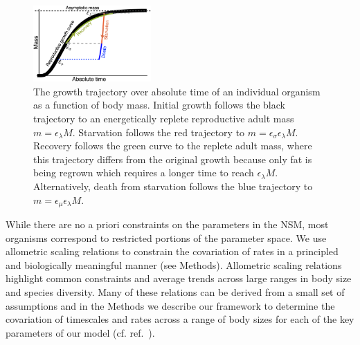 \documentclass[twocolumn,preprintnumbers,amsmath,amssymb,superscriptaddress]{revtex4}
\begin{document}
\begin{bibunit}[unsrt]
\begin{figure}
\centering
\includegraphics[width=0.4\textwidth]{Growth-trajectory-diagram.eps}
\caption{\small{ The growth trajectory over absolute time of an individual organism as a function of body mass.  
Initial growth follows the black trajectory to an energetically replete reproductive adult mass $m=\epsilon_\lambda M$. %
Starvation follows the red trajectory to $m = \epsilon_\sigma \epsilon_\lambda  M$. 
Recovery follows the green curve to the replete adult mass, where this trajectory differs from the original growth because only fat is being regrown which requires a longer time to reach $\epsilon_\lambda M$. %
Alternatively, death from starvation follows the blue trajectory to $m=\epsilon_\mu \epsilon_\lambda  M$.}\label{fig:growth}}
\end{figure}

While there are no a priori constraints on the parameters in the NSM, most
organisms correspond to restricted portions of the parameter space.  We
use allometric scaling relations to constrain the covariation of rates in a
principled and biologically meaningful manner (see Methods).  Allometric scaling relations
highlight common constraints and average trends across large ranges in body
size and species diversity. Many of these relations can be derived from a
small set of assumptions and in the Methods we describe our framework to determine the
covariation of timescales and rates across a range of body sizes for each of
the key parameters of our model (cf. ref.~\citep{Yodzis:1992hg}).  


\end{bibunit}
\end{document}
